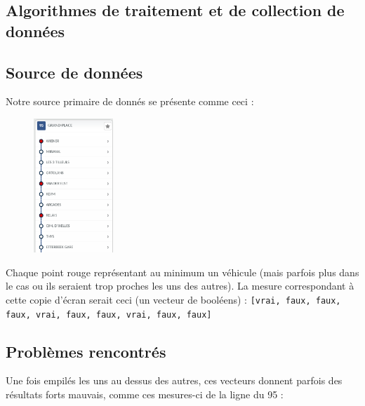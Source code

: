 \documentclass[letterpaper]{article}
\begin{document}
\newpage
\begin{appendices}
\section{Algorithmes de traitement et de collection de données}
\subsection{Source de données}
\label{align}
Notre source primaire de donnés se présente comme ceci :

\begin{figure}[h]
   \centerline{\includegraphics[width=3cm]{mstib.png}}
\end{figure}

Chaque point rouge représentant au minimum un véhicule (mais parfois plus dans le cas ou ils seraient trop proches les uns des autres). La mesure correspondant à cette copie d'écran serait ceci (un vecteur de booléens) : \texttt{[vrai, faux, faux, faux, vrai, faux, faux, vrai, faux, faux]}


\FloatBarrier
\subsection{Problèmes rencontrés}

Une fois empilés les uns au dessus des autres, ces vecteurs donnent parfois des résultats forts mauvais, comme ces mesures-ci de la ligne du 95 :


\end{appendices}
\end{document}
